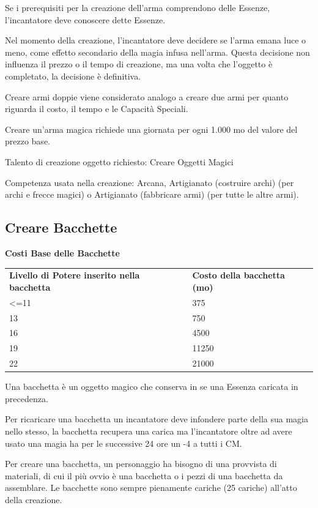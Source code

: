 \documentclass[a4paper,11pt,twoside,openany]{book}
\begin{document}
Se i prerequisiti per la creazione dell'arma comprendono delle Essenze, l'incantatore deve conoscere dette Essenze.

Nel momento della creazione, l'incantatore deve decidere se l'arma emana luce o meno, come effetto secondario della magia infusa nell'arma. Questa decisione non influenza il prezzo o il tempo di creazione, ma una volta che l'oggetto è completato, la decisione è definitiva.

Creare armi doppie viene considerato analogo a creare due armi per quanto riguarda il costo, il tempo e le Capacità Speciali.

Creare un'arma magica richiede una giornata per ogni 1.000 mo del valore del prezzo base.

Talento di creazione oggetto richiesto: Creare Oggetti Magici

Competenza usata nella creazione: Arcana, Artigianato (costruire archi) (per archi e frecce magici) o Artigianato (fabbricare armi) (per tutte le altre armi).

\subsection{Creare Bacchette}

\bigskip

\textbf{Costi Base delle Bacchette}

\begin{tabular}{ll}
	\toprule
	\textbf{Livello di Potere inserito nella bacchetta} & \textbf{Costo della bacchetta (mo)}\\
	\textless=11        & 375\\
	13  & 750\\
	16  & 4500\\
	19  & 11250\\
	22  & 21000\\
\end{tabular}

\bigskip

Una bacchetta è un oggetto magico che conserva in se una Essenza caricata in precedenza.

Per ricaricare una bacchetta un incantatore deve infondere parte della sua magia nello stesso, la bacchetta recupera una carica ma l'incantatore oltre ad avere usato una magia ha per le successive 24 ore un -4 a tutti i CM.

Per creare una bacchetta, un personaggio ha bisogno di una provvista di materiali, di cui il più ovvio è una bacchetta o i pezzi di una bacchetta da assemblare. Le bacchette sono sempre pienamente cariche (25 cariche) all'atto della creazione.
\end{document}
